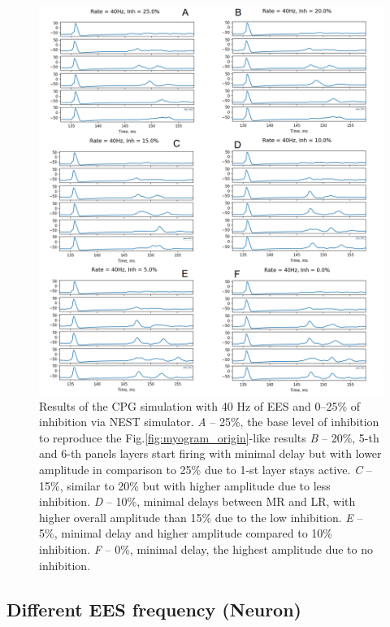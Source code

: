 \documentclass[]{elsarticle}
\begin{document}
\begin{figure}[ht!]
	\centering
	\includegraphics[width=1.0\textwidth]{results/summary_inhibition_nest.png}
	\caption{Results of the CPG simulation with 40 Hz of EES and 0--25\% of inhibition via NEST simulator. 
    \emph{A} -- 25\%, the base level of inhibition to reproduce the Fig.\ref{fig:myogram_origin}-like results 
    \emph{B} -- 20\%, 5-th and 6-th panels layers start firing with minimal delay but with lower amplitude in comparison to 25\% due to 1-st layer stays active. 
    \emph{C} -- 15\%, similar to 20\% but with higher amplitude due to less inhibition. 
    \emph{D} -- 10\%, minimal delays between MR and LR, with higher overall amplitude than 15\% due to the low inhibition. 
    \emph{E} -- 5\%, minimal delay and higher amplitude compared to 10\% inhibition. 
    \emph{F} -- 0\%, minimal delay, the highest amplitude due to no inhibition.}
    \label{fig:summary_inhibition_nest}
\end{figure}


\subsection{Different EES frequency (Neuron)}
\end{document}
